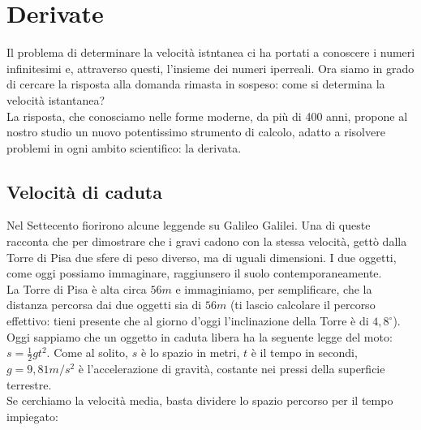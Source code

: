 
\chapter{Derivate}
% 

Il problema di determinare la velocità istntanea ci ha portati a conoscere 
i numeri infinitesimi e, attraverso questi, l'insieme dei numeri iperreali.
Ora siamo in grado di cercare la risposta alla domanda rimasta in sospeso: 
come si determina la velocità istantanea?\\
La risposta, che conosciamo nelle forme moderne, da più di 400 anni,
propone al nostro studio un nuovo potentissimo strumento di calcolo, adatto a 
risolvere problemi in ogni ambito scientifico: la derivata.

\section{Velocità di caduta}
\label{04_diffvelcaduta}
Nel Settecento fiorirono alcune leggende su Galileo Galilei. Una di queste racconta 
che per dimostrare che i gravi cadono con la stessa velocità, gettò dalla Torre
di Pisa due sfere di peso diverso, ma di uguali dimensioni. I due oggetti, come
oggi possiamo immaginare, raggiunsero il suolo contemporaneamente.\\
La Torre di Pisa è alta circa $56m$ e immaginiamo, per semplificare, che la 
distanza percorsa dai due oggetti sia di $56m$ (ti lascio calcolare il 
percorso effettivo: tieni presente che al giorno d'oggi l'inclinazione della 
Torre è di $4,8^\circ$).\\
Oggi sappiamo che un oggetto in caduta libera ha la seguente legge del moto:
\(s=\frac{1}{2}gt^2\). Come al solito, $s$ è lo spazio in metri, $t$ è il 
tempo in secondi, $g=9,81 m/s^2$ è l'accelerazione di gravità, costante nei
pressi della superficie terrestre.\\
Se cerchiamo la velocità media, basta dividere lo spazio percorso per il tempo
impiegato:

